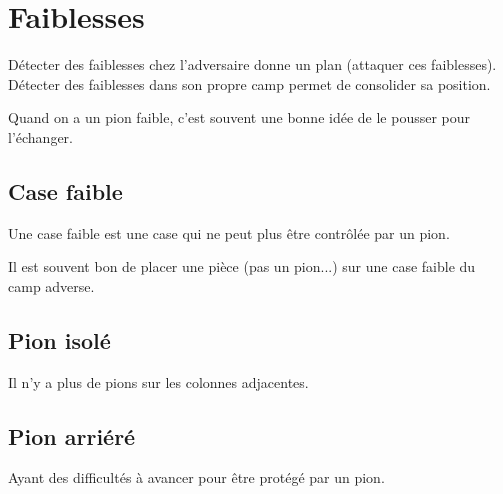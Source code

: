 
\section{Faiblesses}

Détecter des faiblesses chez l'adversaire donne un plan (attaquer ces faiblesses). Détecter des faiblesses dans son propre camp permet de consolider sa position.

Quand on a un pion faible, c'est souvent une bonne idée de le pousser pour l'échanger.

\subsection{Case faible}

Une case faible est une case qui ne peut plus être contrôlée par un pion.

Il est souvent bon de placer une pièce (pas un pion...) sur une case faible du camp adverse.

\subsection{Pion isolé}

Il n'y a plus de pions sur les colonnes adjacentes.

\subsection{Pion arriéré}

Ayant des difficultés à avancer pour être protégé par un pion.


